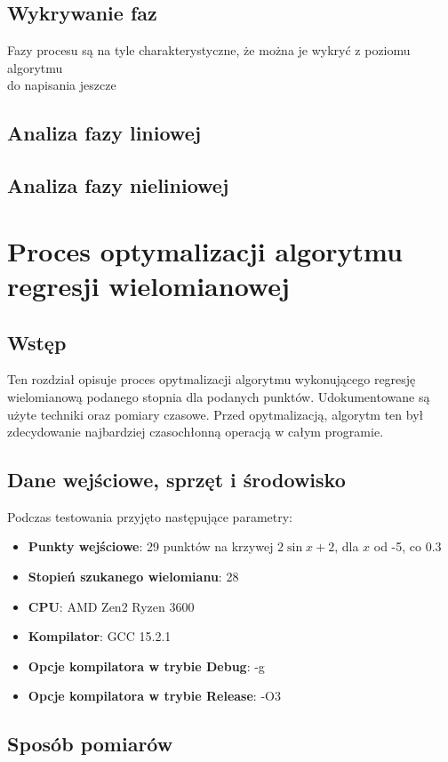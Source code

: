 \documentclass{article}
\begin{document}
	\subsection{Wykrywanie faz}
	Fazy procesu są na tyle charakterystyczne, że można je wykryć z poziomu algorytmu
	\\do napisania jeszcze
	
	\subsection{Analiza fazy liniowej}
	
	\subsection{Analiza fazy nieliniowej}
	
	
	\pagebreak
	
	
	\section{Proces optymalizacji algorytmu regresji wielomianowej}
	\subsection{Wstęp}
	Ten rozdział opisuje proces opytmalizacji algorytmu wykonującego regresję wielomianową podanego stopnia dla podanych punktów. Udokumentowane są użyte techniki oraz pomiary czasowe. Przed opytmalizacją, algorytm ten był zdecydowanie najbardziej czasochłonną operacją w całym programie.
	\subsection{Dane wejściowe, sprzęt i środowisko}
	Podczas testowania przyjęto następujące parametry:
	\begin{itemize}
		\item \textbf{Punkty wejściowe}: 29 punktów na krzywej $2\sin x+2$, dla $x$ od -5, co 0.3
		\item \textbf{Stopień szukanego wielomianu}: 28
		\item \textbf{CPU}: AMD Zen2 Ryzen 3600
		\item \textbf{Kompilator}: GCC 15.2.1
		\item \textbf{Opcje kompilatora w trybie Debug}: -g
		\item \textbf{Opcje kompilatora w trybie Release}: -O3
	\end{itemize}
	
	\subsection{Sposób pomiarów}
\end{document}
